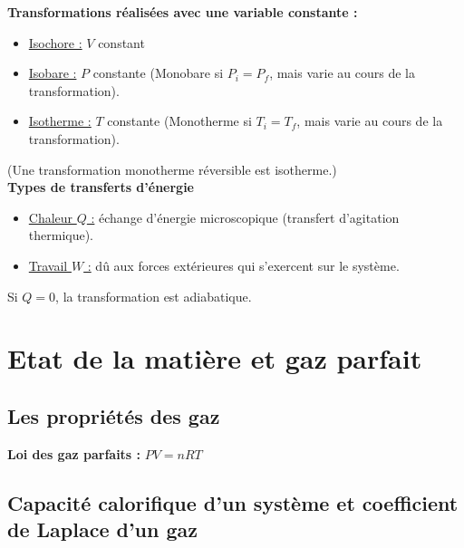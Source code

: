 \documentclass[13pt, twoside, a4paper, french]{report}
\begin{document}
                \textbf{Transformations réalisées avec une variable constante :}
                \vspace{5pt}
                \begin{itemize}
                    \item \underline{Isochore :} $V$ constant
                    \item \underline{Isobare :} $P$ constante (Monobare si $P_i = P_f$, mais varie au cours de la transformation).
                    \item \underline{Isotherme :} $T$ constante (Monotherme si $T_i = T_f$, mais varie au cours de la transformation).
                \end{itemize}
                \vspace{5pt}
                (Une transformation monotherme réversible est isotherme.)\\

                \textbf{Types de transferts d'énergie}
                \vspace{5pt}
                \begin{itemize}
                    \item \underline{Chaleur $Q$ :} échange d'énergie microscopique (transfert d'agitation thermique).
                    \item \underline{Travail $W$ :} dû aux forces extérieures qui s'exercent sur le système.
                \end{itemize}
                \vspace{5pt}
                Si $Q = 0$, la transformation est adiabatique.\\


    \chapter{Etat de la matière et gaz parfait}\label{ch:etat-de-la-matiere-et-gaz-parfait}


        \section{Les propriétés des gaz}\label{sec:les-proprietes-des-gaz}

            \textbf{Loi des gaz parfaits :} $P V = n R T$


        \section{Capacité calorifique d’un système et coefficient de Laplace d’un gaz}\label{sec:capacite-calorifique-dun-systeme-et-coefficient-de-laplace-dun-gaz}
\end{document}
